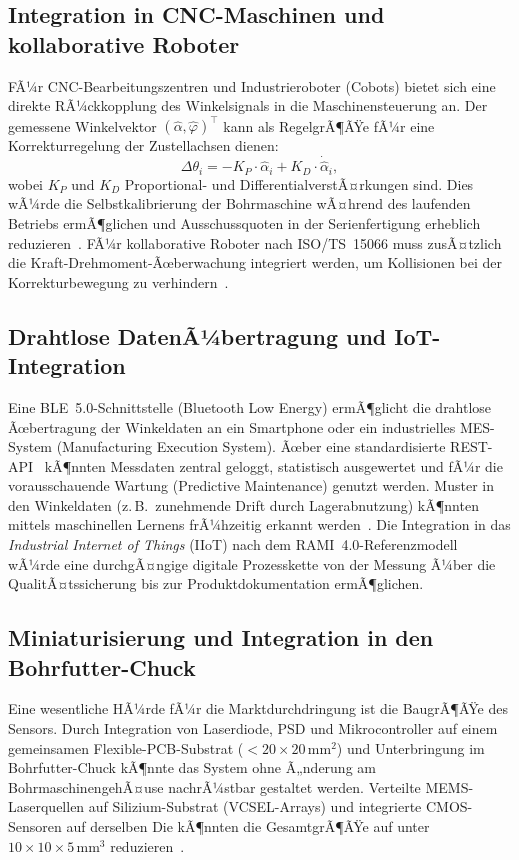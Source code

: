 ﻿\documentclass[a4paper,12pt]{article}
\theoremstyle{definition}
\begin{document}
\subsection{Integration in CNC-Maschinen und kollaborative Roboter}

FÃ¼r CNC-Bearbeitungszentren und Industrieroboter (Cobots) bietet sich eine
direkte RÃ¼ckkopplung des Winkelsignals in die Maschinensteuerung an.
Der gemessene Winkelvektor $(\hat{\alpha}, \hat{\varphi})^\top$ kann als
RegelgrÃ¶ÃŸe fÃ¼r eine Korrekturregelung der Zustellachsen dienen:
\[
  \Delta\theta_i = -K_P \cdot \hat{\alpha}_i + K_D \cdot \dot{\hat{\alpha}}_i,
\]
wobei $K_P$ und $K_D$ Proportional- und DifferentialverstÃ¤rkungen sind.
Dies wÃ¼rde die Selbstkalibrierung der Bohrmaschine wÃ¤hrend des laufenden
Betriebs ermÃ¶glichen und Ausschussquoten in der Serienfertigung erheblich
reduzieren~\cite{ramesh2000error}.
FÃ¼r kollaborative Roboter nach ISO/TS~15066 muss zusÃ¤tzlich die
Kraft-Drehmoment-Ãœberwachung integriert werden, um Kollisionen bei der
Korrekturbewegung zu verhindern~\cite{iso15066}.

\subsection{Drahtlose DatenÃ¼bertragung und IoT-Integration}

Eine BLE~5.0-Schnittstelle (Bluetooth Low Energy) ermÃ¶glicht die drahtlose
Ãœbertragung der Winkeldaten an ein Smartphone oder ein industrielles
MES-System (Manufacturing Execution System).
Ãœber eine standardisierte REST-API~\cite{fielding2000architectural} kÃ¶nnten
Messdaten zentral geloggt, statistisch ausgewertet und fÃ¼r die vorausschauende
Wartung (Predictive Maintenance) genutzt werden.
Muster in den Winkeldaten (z.\,B.\ zunehmende Drift durch Lagerabnutzung)
kÃ¶nnten mittels maschinellen Lernens frÃ¼hzeitig erkannt werden~\cite{mobley2002maintenance}.
Die Integration in das \textit{Industrial Internet of Things} (IIoT) nach dem
RAMI~4.0-Referenzmodell~\cite{rami2015} wÃ¼rde eine durchgÃ¤ngige digitale
Prozesskette von der Messung Ã¼ber die QualitÃ¤tssicherung bis zur
Produktdokumentation ermÃ¶glichen.

\subsection{Miniaturisierung und Integration in den Bohrfutter-Chuck}

Eine wesentliche HÃ¼rde fÃ¼r die Marktdurchdringung ist die BaugrÃ¶ÃŸe des Sensors.
Durch Integration von Laserdiode, PSD und Mikrocontroller auf einem gemeinsamen
Flexible-PCB-Substrat ($< 20 \times 20\,\mathrm{mm}^2$) und Unterbringung im
Bohrfutter-Chuck kÃ¶nnte das System ohne Ã„nderung am BohrmaschinengehÃ¤use
nachrÃ¼stbar gestaltet werden.
Verteilte MEMS-Laserquellen auf Silizium-Substrat (VCSEL-Arrays) und
integrierte CMOS-Sensoren auf derselben Die kÃ¶nnten die GesamtgrÃ¶ÃŸe
auf unter $10 \times 10 \times 5\,\mathrm{mm}^3$ reduzieren~\cite{chua2010mems}.
\end{document}
